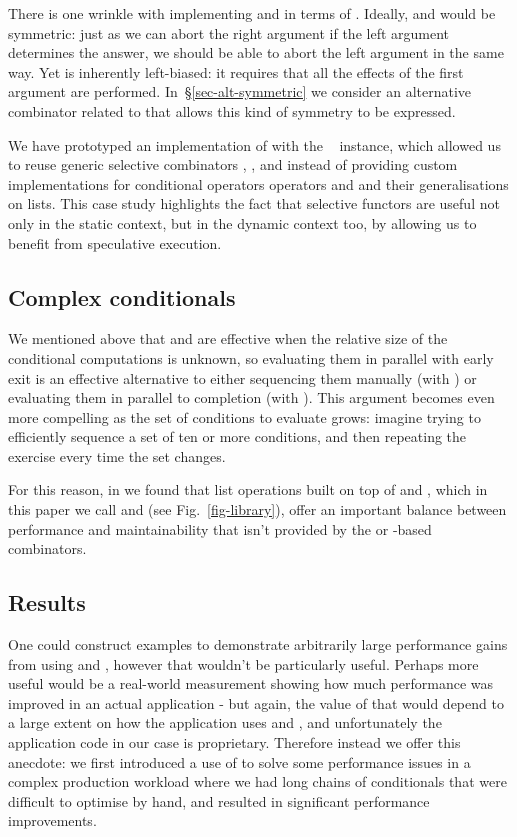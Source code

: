 There is one wrinkle with implementing  and 
in terms of . Ideally,  and  would be
symmetric: just as we can abort the right argument if the left
argument determines the answer, we should be able to abort the left
argument in the same way. Yet  is inherently left-biased:
it requires that all the effects of the first argument are performed.
In~\S\ref{sec-alt-symmetric} we consider an alternative combinator
related to  that allows this kind of symmetry to be expressed.

We have prototyped an implementation of \Haxl with the ~
instance, which allowed us to reuse generic selective combinators
\hs{<||>}, \hs{<&&>},  and  instead of providing custom
implementations for conditional operators operators  and  and
their generalisations on lists. This case study highlights the fact that
selective functors are useful not only in the static context, but in the dynamic
context too, by allowing us to benefit from speculative execution.


\subsection{Complex conditionals}

We mentioned above that  and  are effective when the
relative size of the conditional computations is unknown, so
evaluating them in parallel with early exit is an effective
alternative to either sequencing them manually (with ) or
evaluating them in parallel to completion (with
). This argument becomes even more compelling as the
set of conditions to evaluate grows: imagine trying to efficiently
sequence a set of ten or more conditions, and then repeating the
exercise every time the set changes.

For this reason, in \Haxl we found that list operations built on top
of  and , which in this paper we call  and
 (see Fig.~\ref{fig-library}), offer an important balance
between performance and maintainability that isn't provided by the
 or -based combinators.


\subsection{Results}

One could construct examples to demonstrate arbitrarily large
performance gains from using  and , however that
wouldn't be particularly useful. Perhaps more useful would be a
real-world measurement showing how much performance was improved in an
actual application - but again, the value of that would depend to a
large extent on how the application uses  and , and
unfortunately the application code in our case is
proprietary. Therefore instead we offer this anecdote: we first
introduced a use of  to solve some performance issues in a
complex production workload where we had long chains of conditionals
that were difficult to optimise by hand, and  resulted in
significant performance improvements.
